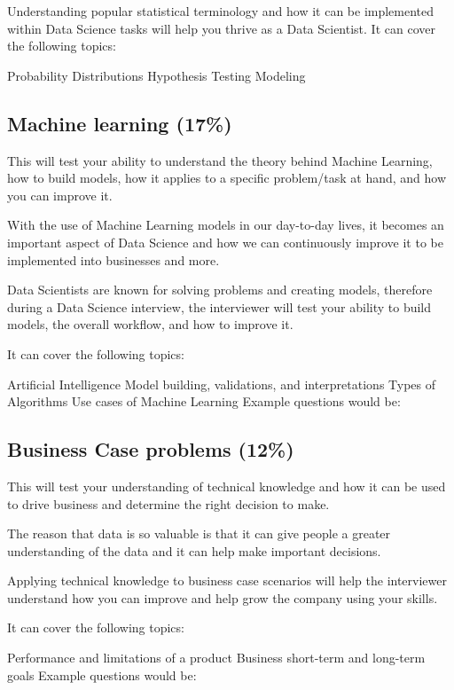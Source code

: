 \documentclass[
]{book}
\begin{document}
Understanding popular statistical terminology and how it can be implemented within Data Science tasks will help you thrive as a Data Scientist. It can cover the following topics:

Probability Distributions
Hypothesis Testing
Modeling

\hypertarget{machine-learning-17-1}{%
\subsection{Machine learning (17\%)}\label{machine-learning-17-1}}

This will test your ability to understand the theory behind Machine Learning, how to build models, how it applies to a specific problem/task at hand, and how you can improve it.

With the use of Machine Learning models in our day-to-day lives, it becomes an important aspect of Data Science and how we can continuously improve it to be implemented into businesses and more.

Data Scientists are known for solving problems and creating models, therefore during a Data Science interview, the interviewer will test your ability to build models, the overall workflow, and how to improve it.

It can cover the following topics:

Artificial Intelligence
Model building, validations, and interpretations
Types of Algorithms
Use cases of Machine Learning
Example questions would be:

\hypertarget{business-case-problems-12-1}{%
\subsection{Business Case problems (12\%)}\label{business-case-problems-12-1}}

This will test your understanding of technical knowledge and how it can be used to drive business and determine the right decision to make.

The reason that data is so valuable is that it can give people a greater understanding of the data and it can help make important decisions.

Applying technical knowledge to business case scenarios will help the interviewer understand how you can improve and help grow the company using your skills.

It can cover the following topics:

Performance and limitations of a product
Business short-term and long-term goals
Example questions would be:
\end{document}
